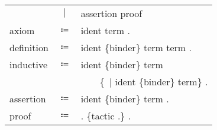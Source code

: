\begin{table}[!htb]
\begin{tabular}{lcl}
            &$\mid$&assertion proof\\
        axiom
            &$\Coloneqq$&\fAxiom{} ident \scolon{} term .\\
        definition
            &$\Coloneqq$&\fDefinition{} ident \{binder\} \scolon{} term \scoloneq{} term .\\
        inductive
            &$\Coloneqq$&\fInductive{} ident \{binder\} \scolon{} term \scoloneq{}\\
            &&~~~~\{~$\mid$ ident \{binder\} \scolon{} term\} .\\
        assertion
            &$\Coloneqq$&\fTheorem{} ident \{binder\} \scolon{} term .\\
        proof
            &$\Coloneqq$&\fProof{} . \{tactic .\} \fQed{} .\\
    \end{tabular}
\end{table}
\newpage
